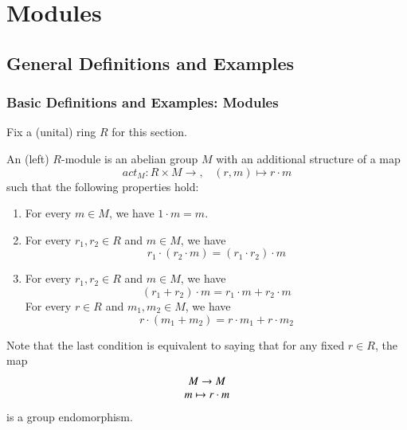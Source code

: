 \documentclass[12pt, a4paper, oneside, openright, titlepage]{book}
\begin{document}
\part{Modules}

\chapter{\textsection\textsection General Definitions and Examples}


\section{\textsection Basic Definitions and Examples: Modules}

Fix a (unital) ring $R$ for this section.

\begin{defn}
    An (left) $R$-module is an abelian group $M$ with an additional structure of a map \begin{equation}
        act_M:R\times M \rightarrow,\;\;\;(r,m)\mapsto r\cdot m
    \end{equation}
    such that the following properties hold:\begin{enumerate}
        \item For every $m \in M$, we have $1 \cdot m = m$.
        \item For every $r_1,r_2 \in R$ and $m \in M$, we have $$r_1\cdot(r_2\cdot m) = (r_1\cdot r_2)\cdot m$$
        \item For every $r_1,r_2 \in R$ and $m \in M$, we have $$(r_1+r_2)\cdot m = r_1\cdot m + r_2\cdot m$$
        For every $r \in R$ and $m_1,m_2 \in M$, we have $$r\cdot (m_1+m_2) = r\cdot m_1 + r\cdot m_2$$
    \end{enumerate}
    Note that the last condition is equivalent to saying that for any fixed $r \in R$, the map $$\begin{array}{c} M\rightarrow M \\ m\mapsto r\cdot m \end{array}$$
    is a group endomorphism.
\end{defn}
\end{document}
